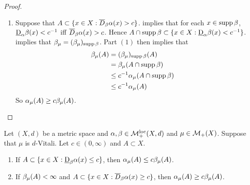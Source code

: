 \documentclass{book}
\begin{document}
\begin{proof}
\begin{enumerate}
\begin{itemize}
				\begin{align*}
					\al_{\mu}(A)
					& = \al_{\mu}(A \cap U) \\
					& = \al_{\mu} \bigg((A \cap U) \cap \bigg[ \bigcup_{B \in \MF} B \bigg] \bigg) \\
					& = \al_{\mu} \bigg(A \cap \bigg[ \bigcup_{B \in \MF} B \bigg] \bigg) \\
					& \leq \al_{\mu}  \bigg( \bigcup_{B \in \MF} B \bigg) \\
					& \leq \al \bigg( \bigcup_{B \in \MF} B \bigg) \\
					& = \sum\limits_{B \in \MF} \al(B) \\
					& \leq c \sum\limits_{B \in \MF} \be(B) \\
					& = c \be \bigg( \bigcup_{B \in \MF} B \bigg) \\
					& \leq c \be(U) \\
					& \leq c \bigg(  \be_{\mu}(A) + \frac{\ep}{c} \bigg)  \\
					& = c \be_{\mu}(A) + \ep 
				\end{align*}
				Since $\ep > 0$ is arbitrary, $\al_{\mu}(A) \leq c \be_{\mu}(A)$.
			\end{itemize}
			\item Suppose that $A \subset \{x \in X: \overline{D}_{\beta}\alpha(x) > c\}$.  implies that for each $x \in \operatorname{supp} \beta$, $\underbar{D}_{\alpha} \beta (x) < c^{-1}$ iff $\overline{D}_{\beta}\alpha(x) > c$. Hence $A \cap \operatorname{supp} \beta \subset \{x \in X: \underbar{D}_{\alpha}\beta(x) < c^{-1}\}$.  implies that $\beta_{\mu} = (\beta_{\mu})_{\operatorname{supp} \beta}$. Part $(1)$ then implies that
			\begin{align*}
				\beta_{\mu}(A)
				& = (\beta_{\mu})_{\operatorname{supp} \beta} (A) \\
				& = \beta_{\mu}(A \cap \operatorname{supp} \beta) \\
				& \leq c^{-1} \alpha_{\mu}(A \cap \operatorname{supp} \beta) \\
				& \leq c^{-1} \alpha_{\mu}(A) 
			\end{align*}
			So $\alpha_{\mu}(A) \geq c \beta_{\mu}(A)$. 
		\end{enumerate}
	\end{proof}

		\begin{ex} 
		Let $(X, d)$ be a metric space and $\alpha, \beta \in \mathcal{M}_+^{\text{loc}}(X, d)$ and $\mu \in \mathcal{M}_+(X)$. Suppose that $\mu$ is $d$-Vitali. Let $c \in (0,\infty)$ and $A \subset X$. 
		\begin{enumerate}
			\item If $A \subset \{x \in X: \underbar{D}_{\beta}\alpha(x) \leq c\}$, then $\al_{\mu}(A) \leq c \be_{\mu}(A)$.
			\item If $\beta_{\mu}(A) < \infty$ and $A \subset \{x \in X: \overline{D}_{\beta}\alpha(x) \geq c\}$, then $\alpha_{\mu}(A) \geq c \beta_{\mu}(A)$. 
		\end{enumerate}
	\end{ex}
	
\end{document}
